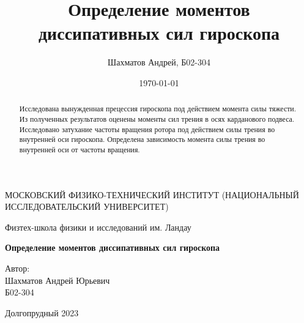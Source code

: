 \documentclass[12pt]{article}
\title{Определение моментов диссипативных сил гироскопа}
\author{Шахматов Андрей, Б02-304}
\date{\today}
\begin{document}
\begin{titlepage}
    \begin{center}
        {\large МОСКОВСКИЙ ФИЗИКО-ТЕХНИЧЕСКИЙ ИНСТИТУТ (НАЦИОНАЛЬНЫЙ ИССЛЕДОВАТЕЛЬСКИЙ УНИВЕРСИТЕТ)}
    \end{center}
    \begin{center}
        {\large Физтех-школа физики и исследований им. Ландау}
    \end{center}
    
    
    \vspace{3cm}
    {\huge
        \begin{center}
            \textbf{Определение моментов диссипативных сил гироскопа}
        \end{center}
    }
    \vspace{2cm}
    \begin{flushright}
        {\LARGE Автор:\\ Шахматов Андрей Юрьевич \\
            \vspace{0.2cm}
            Б02-304}
    \end{flushright}
    \vspace{7 cm}
    \begin{center}
        Долгопрудный 2023
    \end{center}
\end{titlepage}


\begin{abstract}
    Исследована вынужденная прецессия гироскопа под действием момента силы тяжести. Из полученных результатов оценены моменты сил трения в осях 
    карданового подвеса. Исследовано затухание частоты вращения ротора под действием силы трения во внутренней оси гироскопа. Определена зависимость
    момента силы трения во внутренней оси от частоты вращения.
\end{abstract}

\tableofcontents
\end{document}
